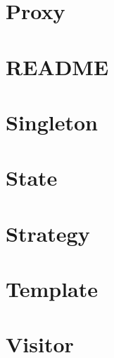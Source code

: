 \let\mypdfximage\pdfximage\def\pdfximage{\immediate\mypdfximage}\documentclass[twoside]{book}
\newcommand{\+}{\discretionary{\mbox{\scriptsize$\hookleftarrow$}}{}{}}
\begin{document}
\chapter{Proxy}
\label{md__d_1__g_i_t__practice__design_patterns__proxy__r_e_a_d_m_e}

\chapter{R\+E\+A\+D\+ME}
\label{md__d_1__g_i_t__practice__design_patterns__r_e_a_d_m_e}

\chapter{Singleton}
\label{md__d_1__g_i_t__practice__design_patterns__singleton__r_e_a_d_m_e}

\chapter{State}
\label{md__d_1__g_i_t__practice__design_patterns__state__r_e_a_d_m_e}

\chapter{Strategy}
\label{md__d_1__g_i_t__practice__design_patterns__strategy__r_e_a_d_m_e}

\chapter{Template}
\label{md__d_1__g_i_t__practice__design_patterns__template__r_e_a_d_m_e}

\chapter{Visitor}
\label{md__d_1__g_i_t__practice__design_patterns__visitor__r_e_a_d_m_e}

\end{document}
